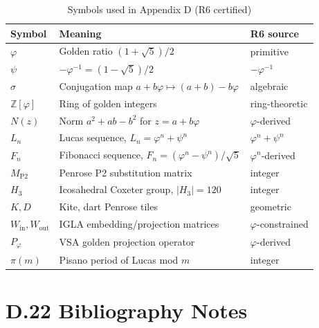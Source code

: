 \begin{table}[h]
\centering
\caption{Symbols used in Appendix D (R6 certified)}
\begin{tabular}{lll}
\toprule
Symbol & Meaning & R6 source \\
\midrule
$\varphi$ & Golden ratio $(1+\sqrt5)/2$ & primitive \\
$\psi$ & $-\varphi^{-1} = (1-\sqrt5)/2$ & $-\varphi^{-1}$ \\
$\sigma$ & Conjugation map $a+b\varphi\mapsto(a+b)-b\varphi$ & algebraic \\
$\mathbb{Z}[\varphi]$ & Ring of golden integers & ring-theoretic \\
$N(z)$ & Norm $a^2+ab-b^2$ for $z=a+b\varphi$ & $\varphi$-derived \\
$L_n$ & Lucas sequence, $L_n = \varphi^n+\psi^n$ & $\varphi^n+\psi^n$ \\
$F_n$ & Fibonacci sequence, $F_n = (\varphi^n-\psi^n)/\sqrt5$ & $\varphi^n$-derived \\
$M_{\mathrm{P2}}$ & Penrose P2 substitution matrix & integer \\
$H_3$ & Icosahedral Coxeter group, $|H_3|=120$ & integer \\
$K, D$ & Kite, dart Penrose tiles & geometric \\
$W_\mathrm{in}, W_\mathrm{out}$ & IGLA embedding/projection matrices & $\varphi$-constrained \\
$P_\varphi$ & VSA golden projection operator & $\varphi$-derived \\
$\pi(m)$ & Pisano period of Lucas mod $m$ & integer \\
\bottomrule
\end{tabular}
\end{table}

\section*{D.22  Bibliography Notes}

